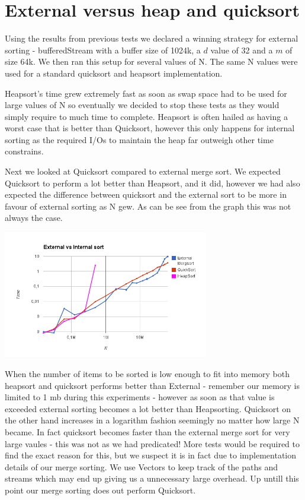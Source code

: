 \section{External versus heap and quicksort}

Using the results from previous tests we declared a winning strategy for external sorting - bufferedStream with a buffer size of 1024k, a $d$ value of 32 and a $m$ of size 64k. We then ran this setup for several values of N. The same N values were used for a standard quicksort and heapsort implementation.

Heapsort's time grew extremely fast as soon as swap space had to be used for large values of N so eventually we decided to stop these tests as they would simply require to much time to complete. Heapsort is often hailed as having a worst case that is better than Quicksort, however this only happens for internal sorting as the required I/Os to maintain the heap far outweigh other time constrains.

Next we looked at Quicksort compared to external merge sort. We expected Quicksort to perform a lot better than Heapsort, and it did, however we had also expected the difference between quicksort and the external sort to be more in favour of external sorting as N gew. As can be see from the graph this was not always the case.

\includegraphics[width=90mm]{graphics/compare.png}

When the number of items to be sorted is low enough to fit into memory both heapsort and quicksort performs better than External - remember our memory is limited to 1 mb during this experiments - however as soon as that value is exceeded external sorting becomes a lot better than Heapsorting. Quicksort on the other hand increases in a logarithm fashion seemingly no matter how large N became. In fact quicksort becomes faster than the external merge sort for very large vaules - this was not as we had predicated! More tests would be required to find the exact reason for this, but we suspect it is in fact due to implementation details of our merge sorting. We use Vectors to keep track of the paths and streams which may end up giving us a unnecessary large overhead. Up untill this point our merge sorting does out perform Quicksort.
